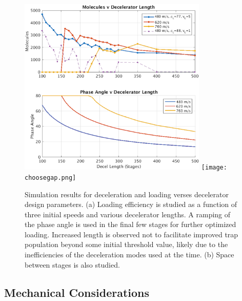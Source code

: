 \begin{figure}[t!]
\includegraphics[width=9cm]{Slowing/mp_elength_phaseload.png}
\texttt{[image: choosegap.png]}
\caption[Decelerator Length Simulation]{\label{fig:mp_elength_phaseload}
Simulation results for deceleration and loading verses decelerator design parameters. (a) Loading efficiency is studied as a function of three initial speeds and various decelerator lengths. A ramping of the phase angle is used in the final few stages for further optimized loading. Increased length is observed not to facilitate improved trap population beyond some initial threshold value, likely due to the inefficiencies of the deceleration modes used at the time. (b) Space between stages is also studied.}
\end{figure}



\subsection{Mechanical Considerations}

